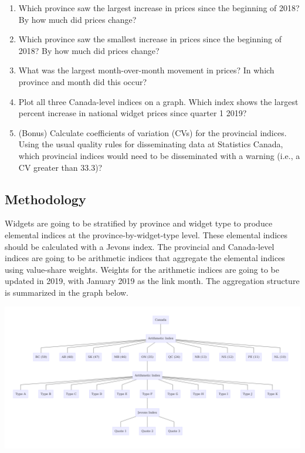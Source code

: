 \documentclass[
]{article}
\begin{document}
\begin{enumerate}
\def\labelenumi{\arabic{enumi}.}
\item
  Which province saw the largest increase in prices since the beginning of 2018? By how much did prices change?
\item
  Which province saw the smallest increase in prices since the beginning of 2018? By how much did prices change?
\item
  What was the largest month-over-month movement in prices? In which province and month did this occur?
\item
  Plot all three Canada-level indices on a graph. Which index shows the largest percent increase in national widget prices since quarter 1 2019?
\item
  (Bonus) Calculate coefficients of variation (CVs) for the provincial indices. Using the usual quality rules for disseminating data at Statistics Canada, which provincial indices would need to be disseminated with a warning (i.e., a CV greater than 33.3)?
\end{enumerate}

\hypertarget{methodology}{%
\subsection{Methodology}\label{methodology}}

Widgets are going to be stratified by province and widget type to produce elemental indices at the province-by-widget-type level. These elemental indices should be calculated with a Jevons index. The provincial and Canada-level indices are going to be arithmetic indices that aggregate the elemental indices using value-share weights. Weights for the arithmetic indices are going to be updated in 2019, with January 2019 as the link month. The aggregation structure is summarized in the graph below.

\includegraphics{img/structure.png}
\end{document}
